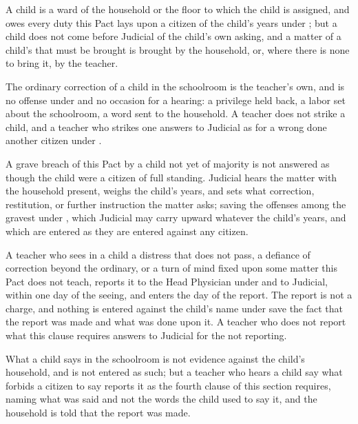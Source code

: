 \begin{clauses}
\item A child is a ward of the household or the floor to which the child is assigned, and owes every duty this Pact lays upon a citizen of the child's years under ; but a child does not come before Judicial of the child's own asking, and a matter of a child's that must be brought is brought by the household, or, where there is none to bring it, by the teacher.
\item The ordinary correction of a child in the schoolroom is the teacher's own, and is no offense under  and no occasion for a hearing: a privilege held back, a labor set about the schoolroom, a word sent to the household. A teacher does not strike a child, and a teacher who strikes one answers to Judicial as for a wrong done another citizen under .
\item A grave breach of this Pact by a child not yet of majority is not answered as though the child were a citizen of full standing. Judicial hears the matter with the household present, weighs the child's years, and sets what correction, restitution, or further instruction the matter asks; saving the offenses among the gravest under , which Judicial may carry upward whatever the child's years, and which are entered as they are entered against any citizen.
\item A teacher who sees in a child a distress that does not pass, a defiance of correction beyond the ordinary, or a turn of mind fixed upon some matter this Pact does not teach, reports it to the Head Physician under  and to Judicial, within one day of the seeing, and enters the day of the report. The report is not a charge, and nothing is entered against the child's name under  save the fact that the report was made and what was done upon it. A teacher who does not report what this clause requires answers to Judicial for the not reporting.
\item What a child says in the schoolroom is not evidence against the child's household, and is not entered as such; but a teacher who hears a child say what  forbids a citizen to say reports it as the fourth clause of this section requires, naming what was said and not the words the child used to say it, and the household is told that the report was made.
\end{clauses}


